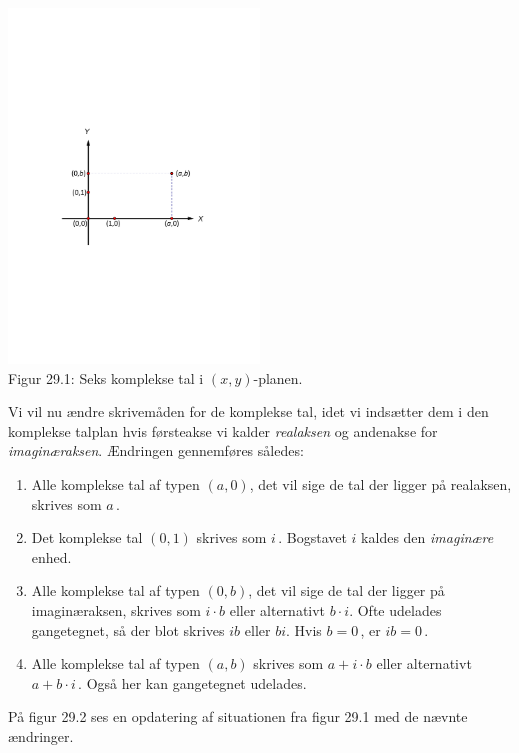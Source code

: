 \begin{center}
	\includegraphics[trim=3cm 9.5cm 3cm 9.5cm,width=0.5\textwidth,clip]{Geometer/KompleksPlan1.pdf}\\
Figur 29.1: Seks komplekse tal i $(x,y)$-planen.		
\end{center}

Vi vil nu ændre skrivemåden for de komplekse tal, idet vi indsætter dem i den komplekse talplan hvis førsteakse vi kalder \textit{realaksen} og andenakse for \textit{imaginæraksen}. Ændringen gennemføres således:
\begin{enumerate}
\item
Alle komplekse tal af typen $(a,0)$, det vil sige de tal der ligger på realaksen, skrives som $a\,$. 
\item
Det komplekse tal $(0,1)$ skrives som $i\,$. Bogstavet $i$ kaldes den \textit{imaginære} enhed.
\item
Alle komplekse tal af typen $(0,b)$, det vil sige de tal der ligger på imaginæraksen, skrives som $i\cdot b$ eller alternativt $b\cdot i$. Ofte udelades gangetegnet, så der blot skrives $ib$ eller $bi$. Hvis $b=0\,$, er $ib=0\,$. 
\item
Alle komplekse tal af typen $(a,b)$ skrives som $a+i\cdot b$ eller alternativt $a+b\cdot i\,$. Også her kan gangetegnet udelades.
\end{enumerate}
På figur 29.2 ses en opdatering af situationen fra figur 29.1 med de nævnte ændringer.

